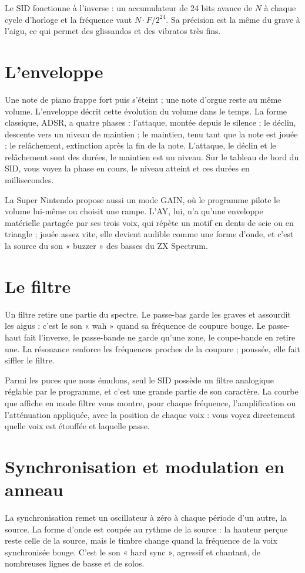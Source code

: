 Le SID fonctionne à l'inverse : un accumulateur de 24 bits avance de $N$ à chaque cycle d'horloge et la fréquence
vaut $N \cdot F / 2^{24}$. Sa précision est la même du grave à l'aigu, ce qui permet des glissandos et des vibratos
très fins.

\section{L'enveloppe}
Une note de piano frappe fort puis s'éteint ; une note d'orgue reste au même volume. L'enveloppe décrit cette
évolution du volume dans le temps. La forme classique, ADSR, a quatre phases : l'attaque, montée depuis le silence ;
le déclin, descente vers un niveau de maintien ; le maintien, tenu tant que la note est jouée ; le relâchement,
extinction après la fin de la note. L'attaque, le déclin et le relâchement sont des durées, le maintien est un
niveau. Sur le tableau de bord du SID, vous voyez la phase en cours, le niveau atteint et ces durées en
millisecondes.

La Super Nintendo propose aussi un mode GAIN, où le programme pilote le volume lui-même ou choisit une rampe. L'AY,
lui, n'a qu'une enveloppe matérielle partagée par ses trois voix, qui répète un motif en dents de scie ou en
triangle ; jouée assez vite, elle devient audible comme une forme d'onde, et c'est la source du son « buzzer » des
basses du ZX Spectrum.

\section{Le filtre}
Un filtre retire une partie du spectre. Le passe-bas garde les graves et assourdit les aigus : c'est le son « wah »
quand sa fréquence de coupure bouge. Le passe-haut fait l'inverse, le passe-bande ne garde qu'une zone, le coupe-bande
en retire une. La résonance renforce les fréquences proches de la coupure ; poussée, elle fait siffler le filtre.

Parmi les puces que nous émulons, seul le SID possède un filtre analogique réglable par le programme, et c'est une
grande partie de son caractère. La courbe que \soft affiche en mode filtre vous montre, pour chaque fréquence,
l'amplification ou l'atténuation appliquée, avec la position de chaque voix : vous voyez directement quelle voix est
étouffée et laquelle passe.

\section{Synchronisation et modulation en anneau}
La synchronisation remet un oscillateur à zéro à chaque période d'un autre, la source. La forme d'onde est coupée au
rythme de la source : la hauteur perçue reste celle de la source, mais le timbre change quand la fréquence de la voix
synchronisée bouge. C'est le son « hard sync », agressif et chantant, de nombreuses lignes de basse et de solos.

